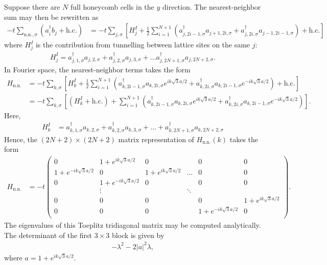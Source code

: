 \documentclass{article}
\newcommand{\ies}[1]{ \begin{equation*} \begin{split} #1 \end{split} \end{equation*}}
\newcommand{\hc}{\text{h.c.}}
\begin{document}
Suppose there are $N$ full honeycomb cells in the $y$ direction. The nearest-neighbor sum may then be rewritten as
\ies{
  -t \sum_{\text{n.n.}, \sigma} 
  \left( a^\dagger_i b_j + \hc \right)
  &=
  -t \sum_{j, \sigma} 
  \left[ H^I_j + 
    \frac{1}{2} \sum_{i=1}^{N+1}  \left( 
      a^\dagger_{j,2i-1, \sigma} a_{j+1, 2i, \sigma}
      + a^\dagger_{j, 2i, \sigma} a_{j-1, 2i-1, \sigma}
    \right)
    +
    \hc
  \right] 
}
where $H^I_j$ is the contribution from tunnelling between lattice sites on the same $j$:
\ies{
  H^I_j = a^\dagger_{j,1,\sigma} a_{j, 2, \sigma} + a^\dagger_{j, 2, \sigma} a_{j, 3, \sigma} + \ldots a^\dagger_{j, 2N+1, \sigma} a_{j, 2 N + 2, \sigma}.
}
In Fourier space, the nearest-neighbor terms takes the form
\ies{
  H_{\text{n.n.}}
  &=
  -t \sum_{k, \sigma}
  \left[
    H^I_k 
    +
    \frac{1}{2}
    \sum_{i=1}^{N+1}
    \left(
      a^\dagger_{k, 2i-1, \sigma} a_{k, 2i, \sigma} e^{ik \sqrt{3}a/2}
      +
      a^\dagger_{k, 2i, \sigma} a_{k, 2i-1, \sigma} e^{-ik \sqrt{3}a/2}
    \right)
    + \hc
  \right]
  \\
  &=
  -t \sum_{k, \sigma} 
  \left[
    (H^I_k + \hc) + \sum_{i=1}^{N+1} \left(
      a^\dagger_{k, 2i-1, \sigma} a_{k, 2i, \sigma} e^{ik \sqrt{3}a/2}
      +
      a^\dagger_{k, 2i, \sigma} a_{k, 2i-1, \sigma} e^{-ik \sqrt{3}a/2}
    \right)
  \right].
}
Here,
\ies{
  H^I_k 
  &=
  a^\dagger_{k,1,\sigma} a_{k, 2, \sigma} 
  +
  a^\dagger_{k, 2, \sigma} a_{k, 3, \sigma} 
  + \ldots +
  a^\dagger_{k, 2N+1, \sigma} a_{k, 2N+2, \sigma}
}
Hence, the $(2N+2)\times(2N+2)$ matrix representation of $H_{\text{n.n.}}(k)$ takes the form
\ies{
  H_{\text{n.n.}}
  &=
  -t \left( \begin{array}{cccccc}
           0 & 1 + e^{i k \sqrt{3} a /2} & 0 & \; & 0 & 0 \\
           1 + e^{-i k \sqrt{3} a /2} & 0 & 1 + e^{i k \sqrt{3} a /2}& \ldots & 0 & 0 \\
           0 & 1 + e^{-i k \sqrt{3} a /2} & 0 & \; & 0 & 0 \\
           \; & \vdots & \; & \ddots & \;  & \; \\
           0 & 0 & 0 & \; & 0 & 1+e^{ik \sqrt{3} a/2} \\
           0 & 0 & 0 & \;  & 1+e^{-ik \sqrt{3} a/2}&0 \\
  \end{array} \right).
}
The eigenvalues of this Toeplitz tridiagonal matrix may be computed analytically. The determinant of the first $3\times3$ block is given by
\ies{
  - \lambda^2 - 2 |a|^2 \lambda,
}
where $a= 1+e^{i k \sqrt{3}a/2}$.
\end{document}
